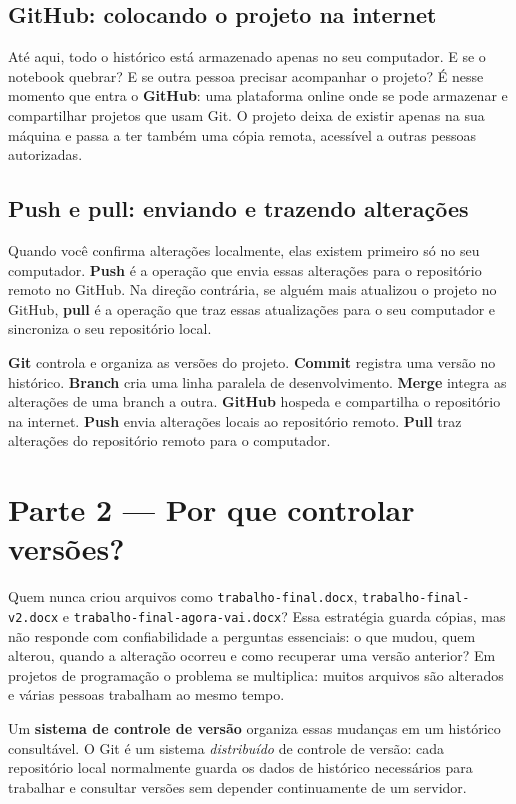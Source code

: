 \documentclass[11pt,a4paper]{article}
\begin{document}
\subsection*{GitHub: colocando o projeto na internet}
Até aqui, todo o histórico está armazenado apenas no seu computador. E se o notebook quebrar? E se outra pessoa precisar acompanhar o projeto? É nesse momento que entra o \textbf{GitHub}: uma plataforma online onde se pode armazenar e compartilhar projetos que usam Git. O projeto deixa de existir apenas na sua máquina e passa a ter também uma cópia remota, acessível a outras pessoas autorizadas.

\subsection*{Push e pull: enviando e trazendo alterações}
Quando você confirma alterações localmente, elas existem primeiro só no seu computador. \textbf{Push} é a operação que envia essas alterações para o repositório remoto no GitHub. Na direção contrária, se alguém mais atualizou o projeto no GitHub, \textbf{pull} é a operação que traz essas atualizações para o seu computador e sincroniza o seu repositório local.

\begin{tcolorbox}[title={RESUMO DA ANALOGIA}]
\textbf{Git} controla e organiza as versões do projeto. \textbf{Commit} registra uma versão no histórico. \textbf{Branch} cria uma linha paralela de desenvolvimento. \textbf{Merge} integra as alterações de uma branch a outra. \textbf{GitHub} hospeda e compartilha o repositório na internet. \textbf{Push} envia alterações locais ao repositório remoto. \textbf{Pull} traz alterações do repositório remoto para o computador.
\end{tcolorbox}

\section*{Parte 2 --- Por que controlar versões?}
Quem nunca criou arquivos como \texttt{trabalho-final.docx}, \texttt{trabalho-final-v2.docx} e \texttt{trabalho-final-agora-vai.docx}? Essa estratégia guarda cópias, mas não responde com confiabilidade a perguntas essenciais: o que mudou, quem alterou, quando a alteração ocorreu e como recuperar uma versão anterior? Em projetos de programação o problema se multiplica: muitos arquivos são alterados e várias pessoas trabalham ao mesmo tempo.

Um \textbf{sistema de controle de versão} organiza essas mudanças em um histórico consultável. O Git é um sistema \emph{distribuído} de controle de versão: cada repositório local normalmente guarda os dados de histórico necessários para trabalhar e consultar versões sem depender continuamente de um servidor.
\end{document}
